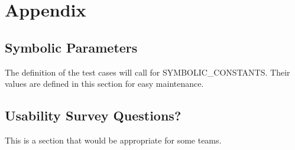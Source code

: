 \documentclass[12pt, titlepage]{article}
\begin{document}




\newpage

\section{Appendix}

\subsection{Symbolic Parameters}

The definition of the test cases will call for SYMBOLIC\_CONSTANTS.
Their values are defined in this section for easy maintenance.

\subsection{Usability Survey Questions?}

This is a section that would be appropriate for some teams.
\end{document}
